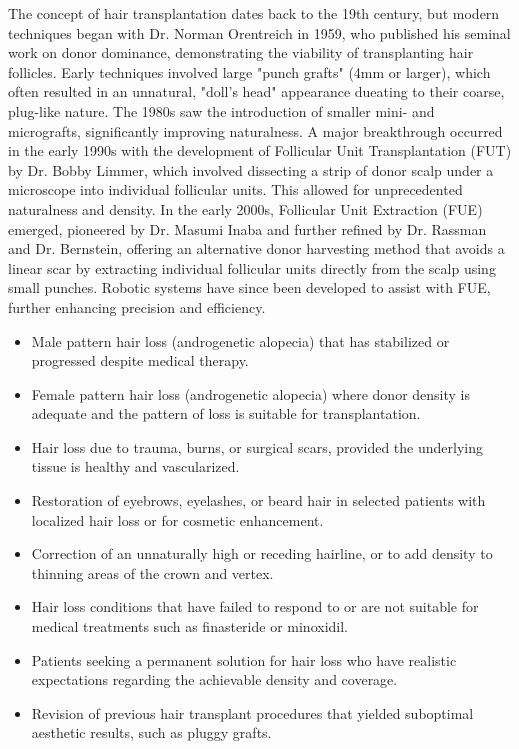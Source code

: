 The concept of hair transplantation dates back to the 19th century, but modern techniques began with Dr. Norman Orentreich in 1959, who published his seminal work on donor dominance, demonstrating the viability of transplanting hair follicles. Early techniques involved large "punch grafts" (4mm or larger), which often resulted in an unnatural, "doll's head" appearance dueating to their coarse, plug-like nature. The 1980s saw the introduction of smaller mini- and micrografts, significantly improving naturalness. A major breakthrough occurred in the early 1990s with the development of Follicular Unit Transplantation (FUT) by Dr. Bobby Limmer, which involved dissecting a strip of donor scalp under a microscope into individual follicular units. This allowed for unprecedented naturalness and density. In the early 2000s, Follicular Unit Extraction (FUE) emerged, pioneered by Dr. Masumi Inaba and further refined by Dr. Rassman and Dr. Bernstein, offering an alternative donor harvesting method that avoids a linear scar by extracting individual follicular units directly from the scalp using small punches. Robotic systems have since been developed to assist with FUE, further enhancing precision and efficiency.

\begin{itemize}
  \item Male pattern hair loss (androgenetic alopecia) that has stabilized or progressed despite medical therapy.
  \item Female pattern hair loss (androgenetic alopecia) where donor density is adequate and the pattern of loss is suitable for transplantation.
  \item Hair loss due to trauma, burns, or surgical scars, provided the underlying tissue is healthy and vascularized.
  \item Restoration of eyebrows, eyelashes, or beard hair in selected patients with localized hair loss or for cosmetic enhancement.
  \item Correction of an unnaturally high or receding hairline, or to add density to thinning areas of the crown and vertex.
  \item Hair loss conditions that have failed to respond to or are not suitable for medical treatments such as finasteride or minoxidil.
  \item Patients seeking a permanent solution for hair loss who have realistic expectations regarding the achievable density and coverage.
  \item Revision of previous hair transplant procedures that yielded suboptimal aesthetic results, such as pluggy grafts.
\end{itemize}

